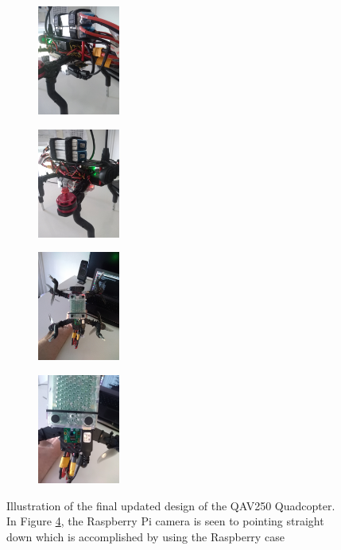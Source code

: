 \documentclass[../Head/report.tex]{subfiles}
\begin{document}
\begin{figure}[H]
    \centering
    \begin{subfigure}[b]{.20\textwidth}
        \centering
        \includegraphics[height=3.6cm]{../Figures/drone/drone_close1.jpg}
        \caption{}
        \label{fig:drone_close_one}
    \end{subfigure}
    \begin{subfigure}[b]{.20\textwidth}
        \centering
        \includegraphics[height=3.6cm]{../Figures/drone/drone_close2.jpg}
        \caption{}
        \label{fig:drone_close_two}
    \end{subfigure}
    \begin{subfigure}[b]{.20\textwidth}
        \centering
        \includegraphics[height=3.6cm]{../Figures/drone/drone_bottom.jpg}
        \caption{}
        \label{fig:drone_bottom}
    \end{subfigure}
    \begin{subfigure}[b]{.20\textwidth}
        \centering
        \includegraphics[height=3.6cm]{../Figures/drone/drone_bottom_zoom.jpg}
        \caption{}
        \label{fig:drone_bottom_zoom}
    \end{subfigure}
    \caption{Illustration of the final updated design of the QAV250 Quadcopter. In Figure \ref{fig:drone_bottom_zoom}, the Raspberry Pi camera is seen to pointing straight down which is accomplished by using the Raspberry case}
    \label{fig:drone}
\end{figure}
\end{document}
